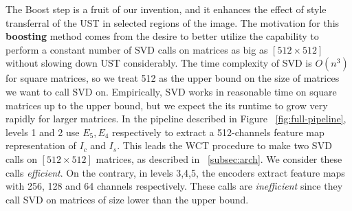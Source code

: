 The Boost step is a fruit of our invention, and it enhances the effect of style transferral of the UST in selected regions of the image. The motivation for this \textbf{boosting} method comes from the desire to better utilize the capability to perform a constant number of SVD calls on matrices as big as $[512\times 512]$ without slowing down UST considerably. The time complexity of SVD is $O(n^3)$ for square matrices, so we treat 512 as the upper bound on the size of matrices we want to call SVD on. Empirically, SVD works in reasonable time on square matrices up to the upper bound, but we expect the its runtime to grow very rapidly for larger matrices. In the pipeline described in Figure ~\ref{fig:full-pipeline}, levels 1 and 2 use $E_5, E_4$ respectively to extract a 512-channels feature map representation of $I_c$ and $I_s$. This leads the WCT procedure to make two SVD calls on $[512\times 512]$ matrices, as described in ~\ref{subsec:arch}. We consider these calls \textit{efficient}. On the contrary, in levels 3,4,5, the encoders extract feature maps with 256, 128 and 64 channels respectively. These calls are \textit{inefficient} since they call SVD on matrices of size lower than the upper bound.\\

